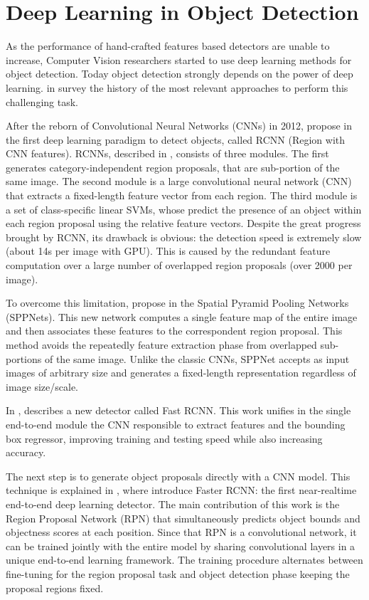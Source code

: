  \section{Deep Learning in Object Detection}
 As the performance of hand-crafted features based detectors are unable to increase, Computer Vision researchers started to use deep learning methods for object detection. Today object detection strongly depends on the power of deep learning. \citeauthor{computervisionsurvey} in \cite{computervisionsurvey} survey the history of the most relevant approaches to perform this challenging task. 
 
 After the reborn of Convolutional Neural Networks (CNNs) in 2012, \citeauthor{rcnn} propose in \cite{rcnn} the first deep learning paradigm to detect objects, called RCNN (Region with CNN features). RCNNs, described in \cite{rcnn}, consists of three modules. The first generates category-independent region proposals, that are sub-portion of the same image. The second module is a large convolutional neural network (CNN) that extracts a fixed-length feature
 vector from each region. The third module is a set of class-specific linear SVMs, whose predict the presence of an object within each region proposal using the relative feature vectors. Despite the great progress brought by RCNN, its drawback is obvious: the detection speed is extremely slow (about 14s per
 image with GPU). This is caused by the redundant feature computation over a large number of overlapped region proposals (over 2000 per image).
 
 To overcome this limitation, \citeauthor{sppnet} propose in \cite{sppnet} the Spatial Pyramid Pooling Networks (SPPNets). This new network computes a single feature map of the entire image and then associates these features to the correspondent region proposal. This method avoids the repeatedly feature extraction phase from overlapped sub-portions of the same image.  Unlike the classic CNNs, SPPNet accepts as input images of arbitrary size and generates a fixed-length representation regardless of image size/scale. 
 
 In \cite{fastrcnn}, \citeauthor{fastrcnn} describes a new detector called Fast RCNN. This work unifies in the single end-to-end module the CNN responsible to extract features and the bounding box regressor, improving training and testing speed while also increasing accuracy. 
 
 The next step is to generate object proposals directly with a CNN model. This technique is explained in \cite{fasterrcnn}, where \citeauthor{fasterrcnn} introduce Faster RCNN: the first near-realtime
 end-to-end deep learning detector. The main contribution of this work is the Region Proposal Network (RPN) that simultaneously predicts object bounds and objectness scores at each position. Since that RPN is a convolutional network, it can be trained jointly with the entire model by sharing convolutional layers in a unique end-to-end learning framework. The training procedure alternates between fine-tuning for the region proposal task and object detection phase keeping the proposal regions fixed. 
 
